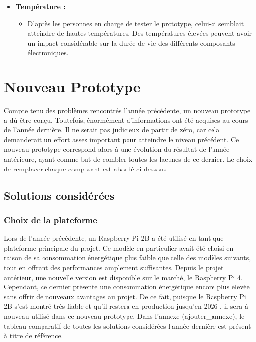 \begin{itemize}
~

  \item \textbf{Température :}
  \begin{itemize}
    \item D'après les personnes en charge de tester le prototype, celui-ci semblait atteindre de hautes températures. Des températures élevées peuvent avoir un impact considérable sur la durée de vie des différents composants électroniques.
  \end{itemize}
\end{itemize}


\section{Nouveau Prototype}

\noindent
Compte tenu des problèmes rencontrés l'année précédente, un nouveau prototype a dû être conçu. Toutefois, énormément d'informations ont été acquises au cours de l'année dernière. Il ne serait pas judicieux de partir de zéro, car cela demanderait un effort assez important pour atteindre le niveau précédent. Ce nouveau prototype correspond alors à une évolution du résultat de l'année antérieure, ayant comme but de combler toutes les lacunes de ce dernier. Le choix de remplacer chaque composant est abordé ci-dessous.

\subsection{Solutions considérées}
\label{sec:sol_hard}

\subsubsection{Choix de la plateforme}

\noindent
Lors de l'année précédente, un Raspberry Pi 2B a été utilisé en tant que plateforme principale du projet. Ce modèle en particulier avait été choisi en raison de sa consommation énergétique plus faible que celle des modèles suivants, tout en offrant des performances amplement suffisantes. Depuis le projet antérieur, une nouvelle version est disponible sur le marché, le Raspberry Pi 4. Cependant, ce dernier présente une consommation énergétique encore plus élevée sans offrir de nouveaux avantages au projet. De ce fait, puisque le Raspberry Pi 2B s'est montré très fiable et qu'il restera en production jusqu'en 2026 \cite{rasp_prod}, il sera à nouveau utilisé dans ce nouveau prototype. Dans l'annexe (ajouter\_annexe), le tableau comparatif de toutes les solutions considérées l'année dernière est présent à titre de référence.


